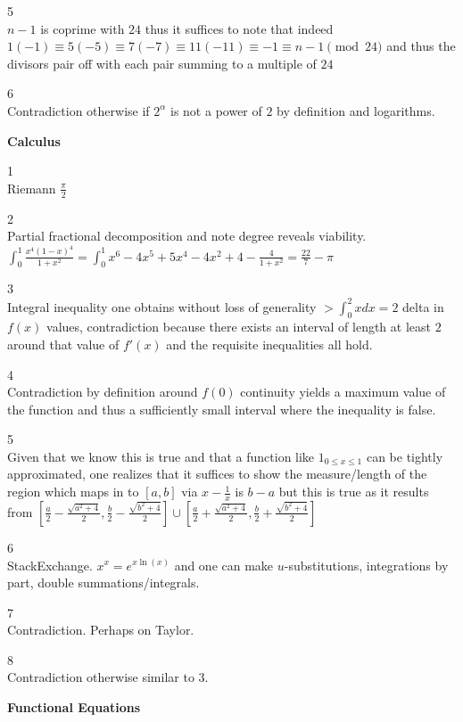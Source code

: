 5 \\
$n-1$ is coprime with $24$ thus it suffices to note that indeed $1(-1) \equiv 5(-5) \equiv 7(-7) \equiv 11(-11) \equiv -1 \equiv n-1 \pmod{24}$ and thus the divisors pair off with each pair summing to a multiple of $24$

6 \\
Contradiction otherwise if $2^{\alpha}$ is not a power of $2$ by definition and logarithms.

\newpage

\textbf{Calculus}

1 \\
Riemann $\boxed{\frac{\pi}{2}}$

2 \\
Partial fractional decomposition and note degree reveals viability. $\int_0^1 \frac{x^4(1-x)^4}{1+x^2} = \int_0^1 x^6-4x^5+5x^4-4x^2+4-\frac{4}{1+x^2} = \boxed{\frac{22}{7}-\pi}$

3 \\
Integral inequality one obtains without loss of generality $> \int_0^2 x dx=2$ delta in $f(x)$ values, contradiction because there exists an interval of length at least $2$ around that value of $f'(x)$ and the requisite inequalities all hold.

4 \\
Contradiction by definition around $f(0)$ continuity yields a maximum value of the function and thus a sufficiently small interval where the inequality is false.

5 \\
Given that we know this is true and that a function like $1_{0 \le x \le 1}$ can be tightly approximated, one realizes that it suffices to show the measure/length of the region which maps in to $[a,b]$ via $x-\frac{1}{x}$ is $b-a$ but this is true as it results from $[\frac{a}{2}-\frac{\sqrt{a^2+4}}{2},\frac{b}{2}-\frac{\sqrt{b^2+4}}{2}] \cup [\frac{a}{2}+\frac{\sqrt{a^2+4}}{2},\frac{b}{2}+\frac{\sqrt{b^2+4}}{2}]$

6 \\
StackExchange. $x^x=e^{x\ln(x)}$ and one can make $u$-substitutions, integrations by part, double summations/integrals.

7 \\
Contradiction. Perhaps on Taylor.

8 \\
Contradiction otherwise similar to 3.

\newpage

\textbf{Functional Equations}

